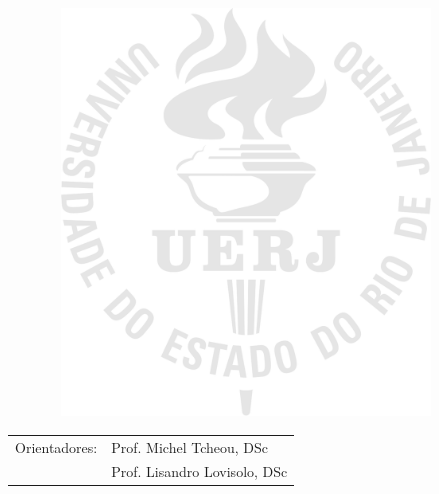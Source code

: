 \begin{center}

\setNomeAluno
\vspace{2cm}

\textbf{\setTitulo}

\vspace{1.0cm}

\begin{figure}[hbt!]
\begin{center}
\includegraphics[width=10.48cm,height=10.8cm]{./01_Pre_textuais/figures/logo_uerj_gnd_pb.png}
\end{center}
\end{figure}

\vspace{-9cm}
\begin{flushright}
\parbox{8cm}{
}
\end{flushright}

\vspace{4.0cm}


\begin{table}[h!]
\centering
\begin{tabular}{ll}
Orientadores: & Prof. Michel Tcheou, DSc\\
					& Prof. Lisandro Lovisolo, DSc\\
\end{tabular}
\end{table}


\par\vfill

\setLocationDate
\end{center}